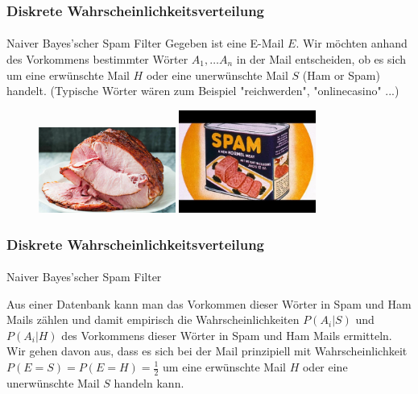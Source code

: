 \documentclass{beamer}
\begin{document}
\begin{frame}
    \frametitle{Diskrete Wahrscheinlichkeitsverteilung}
\framesubtitle{}

\begin{block}{Naiver Bayes'scher Spam Filter}
Gegeben ist eine E-Mail $E$.  Wir möchten anhand des Vorkommens bestimmter Wörter $A_1, \ldots A_n$ in der Mail entscheiden, ob es sich um eine erwünschte Mail $H$ oder eine unerwünschte Mail $S$ (Ham or Spam) handelt. 
(Typische Wörter wären zum Beispiel "reichwerden",  "onlinecasino" ...)
\end{block}

\begin{figure}[htp]
      \centering
    \includegraphics[width=0.4\textwidth]{img/ham}
    \includegraphics[width=0.4\textwidth]{img/spam}

\end{figure}



 \end{frame}


\begin{frame}
    \frametitle{Diskrete Wahrscheinlichkeitsverteilung}
\framesubtitle{}

\begin{block}{Naiver Bayes'scher Spam Filter}

Aus einer Datenbank kann man das Vorkommen dieser Wörter in Spam und Ham Mails zählen und damit empirisch die Wahrscheinlichkeiten $P(A_i | S)$ und $P(A_i | H) $ des Vorkommens dieser Wörter in Spam und Ham Mails ermitteln.  Wir gehen davon aus, dass es sich bei der Mail  prinzipiell mit  Wahrscheinlichkeit $P(E= S) = P(E= H)= \frac{1}{2}$  um eine erwünschte  Mail $H$ oder eine unerwünschte Mail $S$  handeln kann. 
\end{block}

 \end{frame}
\end{document}
